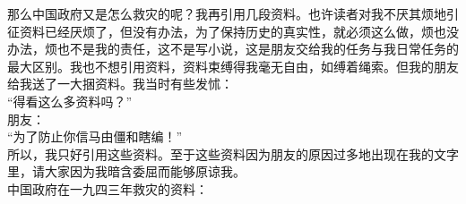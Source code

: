 那么中国政府又是怎么救灾的呢？我再引用几段资料。也许读者对我不厌其烦地引征资料已经厌烦了，但没有办法，为了保持历史的真实性，就必须这么做，烦也没办法，烦也不是我的责任，这不是写小说，这是朋友交给我的任务与我日常任务的最大区别。我也不想引用资料，资料束缚得我毫无自由，如缚着绳索。但我的朋友给我送了一大捆资料。我当时有些发怵：\\

“得看这么多资料吗？”\\

朋友：\\

“为了防止你信马由僵和瞎编！”\\

所以，我只好引用这些资料。至于这些资料因为朋友的原因过多地出现在我的文字里，请大家因为我暗含委屈而能够原谅我。\\

中国政府在一九四三年救灾的资料：\\

